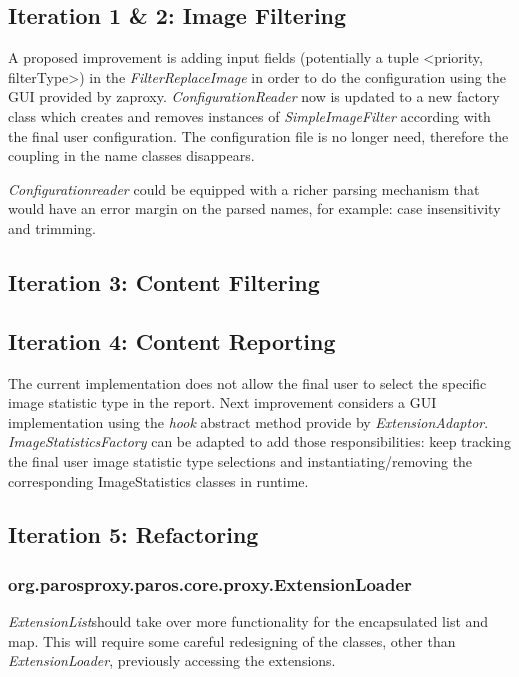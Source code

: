 \subsection{Iteration 1 \& 2: Image Filtering}
A proposed improvement is adding input fields (potentially a tuple <priority, filterType>) in the \textit{FilterReplaceImage} in order to do the configuration using the GUI provided by zaproxy. \textit{ConfigurationReader} now is updated to a new factory class which creates and removes instances of \textit{SimpleImageFilter} according with the final user configuration. The configuration file is no longer need, therefore the coupling in the name classes disappears.

\textit{Configurationreader} could be equipped with a richer parsing mechanism that would have an error margin on the parsed names, for example: case insensitivity and trimming.
\subsection{Iteration 3: Content Filtering}
\subsection{Iteration 4: Content Reporting}
The current implementation does not allow the final user to select the specific image statistic type in the report. Next improvement considers a GUI implementation using the \textit{hook} abstract method provide by \textit{ExtensionAdaptor}. \textit{ImageStatisticsFactory} can be adapted to add those responsibilities: keep tracking the final user image statistic type selections and instantiating/removing the corresponding ImageStatistics classes in runtime.

\subsection{Iteration 5: Refactoring}
\subsubsection{org.parosproxy.paros.core.proxy.ExtensionLoader}
\textit{ExtensionList}should take over more functionality for the encapsulated list and map. This will require some careful redesigning of the classes, other than \textit{ExtensionLoader}, previously accessing the extensions.
